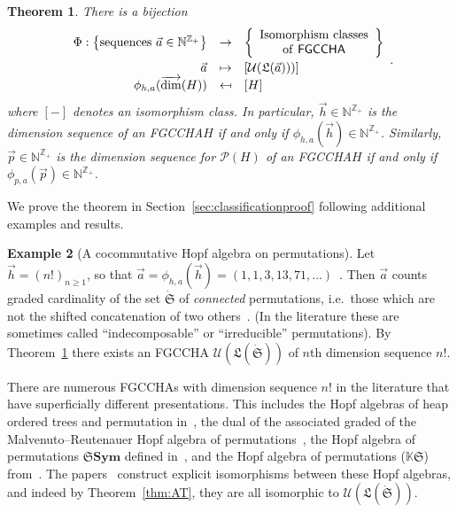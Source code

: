 \documentclass[11pt]{amsart}
\newtheorem{theorem}{Theorem}[section]
\theoremstyle{definition}
\newtheorem{example}[theorem]{Example}
\numberwithin{equation}{section}
\def\NN{{\mathbb N}}
\def\ZZ{{\mathbb Z}}
\newcommand{\FGCCHA}{\textsf{FGCCHA}\xspace}
\newcommand{\FGCCHAs}{\textsf{FGCCHA}s\xspace}
\newcommand{\vecdim}{\overrightarrow{\dim}}
\begin{document}
\begin{theorem}
\label{thm:a sequence}
There is a bijection
\[
\begin{array}{rcl}
\Phi: 
\left\{ \text{sequences }\vec{a} \in \NN^{\ZZ_+} \right\} & \to & \left\{ \begin{array}{c} \text{Isomorphism classes} \\ \text{of \FGCCHA} \end{array} \right\} \\[2ex]
\vec{a} & \mapsto & [\mathcal{U}(\mathfrak{L}(\vec{a})))]\\
\phi_{h,a}(\vecdim(H)) & \mapsfrom & [H]
\end{array}.
\]
where $[-]$ denotes an isomorphism class.  
In particular, $\vec{h} \in \NN^{\ZZ_+}$ is the dimension sequence of an \FGCCHA $H$ if and only if $\phi_{h, a}(\vec{h}) \in \NN^{\ZZ_+}$.  
Similarly, $\vec{p} \in \NN^{\ZZ_{+}}$ is the dimension sequence for $\mathcal{P}(H)$ of an \FGCCHA $H$ if and only if $\phi_{p, a}(\vec{p}) \in \NN^{\ZZ_{+}}$.
\end{theorem}

We prove the theorem in Section~\ref{sec:classificationproof} following additional examples and results. 

\begin{example}[A cocommutative Hopf algebra on permutations]
\label{example:hopf_algebras_of_permutations}
    Let $\vec{h} = (n!)_{n \geq 1}$, so that $\vec{a} = \phi_{h,a}(\vec{h}) = (1,1,3,13,71,\ldots)$~\cite[\href{https://oeis.org/A003319}{A003319}]{OEIS}.  
    Then $\vec{a}$ counts graded cardinality of the set $\dot{\mathfrak{S}}$ of \emph{connected} permutations, i.e.~those which are not the shifted concatenation of two others~\cite{AS05}.  
    (In the literature these are sometimes called ``indecomposable'' or ``irreducible'' permutations).
    By Theorem~\ref{thm:a sequence} there exists an \textsf{FGCCHA}
    $\mathcal{U}(\mathfrak{L}(\dot{\mathfrak{S}}))$ of $n$th dimension sequence $n!$.  
    
    There are numerous \FGCCHAs with dimension sequence $n!$ in the literature that have superficially different presentations.  
    This includes the Hopf algebras of heap ordered trees and permutation in~\cite{GL09}, the dual of the associated graded of the Malvenuto--Reutenauer Hopf algebra of permutations~\cite{AS05cc}, the Hopf algebra of permutations $\mathbf{\mathfrak{S}Sym}$ defined in~\cite[\S 3]{HNT08}, and the Hopf algebra of permutations ($\mathbb{K}\mathfrak{S}$) from~\cite[\S 5]{Li15}.
    The papers~\cite{AS05cc, GL09, HNT08, Li15} construct explicit isomorphisms between these Hopf algebras, and indeed by Theorem~\ref{thm:AT}, they are all isomorphic to $\mathcal{U}(\mathfrak{L}(\dot{\mathfrak{S}}))$.
    \end{example}
\end{document}
